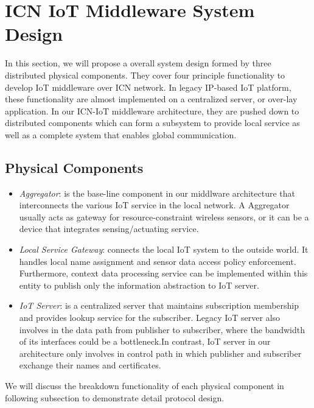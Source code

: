 \section{ICN IoT Middleware System Design}
In this section, we will propose a overall system design formed by three distributed physical components. They cover four principle functionality to develop IoT middleware over ICN network. In legacy IP-based IoT platform, these functionality are almost implemented on a centralized server, or over-lay application. In our ICN-IoT middleware architecture, they are pushed down to distributed components which can form a subsystem to provide local service as well as a complete system that enables global communication. 
\subsection{Physical Components}
\begin{itemize}
\vspace{-2pt}\item{\em Aggregator}:
is the base-line component in our middlware architecture that interconnects the various IoT service in the local network. A Aggregator usually acts as gateway for resource-constraint wireless sensors, or it can be a device that integrates sensing/actuating service. 
\vspace{-2pt}\item{\em Local Service Gateway}:
connects the local IoT system to the outside world. It handles local name assignment and sensor data access policy enforcement. Furthermore, context data processing service can be implemented within this entity to publish only the information abstraction to IoT server.    
\vspace{-2pt}\item{\em IoT Server}:
is a centralized server that maintains subscription membership and provides lookup service for the subscriber. Legacy IoT server also involves in the data path from publisher to subscriber, where the bandwidth of its interfaces could be a bottleneck.In contrast, IoT server in our architecture only involves in control path in which publisher and subscriber exchange their names and certificates.  
\end{itemize}

We will discuss the breakdown functionality of each  physical component in following subsection to demonstrate detail protocol design.
